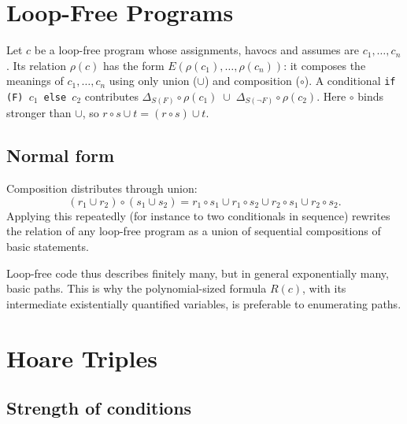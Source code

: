  
\section{Loop-Free Programs}
 
Let $c$ be a loop-free program whose assignments, havocs and assumes are $c_1, \ldots, c_n$. Its relation $\rho(c)$ has the form $E(\rho(c_1), \ldots, \rho(c_n))$: it composes the meanings of $c_1, \ldots, c_n$ using only union ($\cup$) and composition ($\circ$). A conditional \texttt{if (F) $c_1$ else $c_2$} contributes $\Delta_{S(F)} \circ \rho(c_1) \;\cup\; \Delta_{S(\neg F)} \circ \rho(c_2)$. Here $\circ$ binds stronger than $\cup$, so $r \circ s \cup t = (r \circ s) \cup t$.
 
\subsection*{Normal form}
 
Composition distributes through union:
\[
(r_1 \cup r_2) \circ (s_1 \cup s_2) = r_1 \circ s_1 \cup r_1 \circ s_2 \cup r_2 \circ s_1 \cup r_2 \circ s_2.
\]
Applying this repeatedly (for instance to two conditionals in sequence) rewrites the relation of any loop-free program as a union of sequential compositions of basic statements.
 
 
Loop-free code thus describes finitely many, but in general exponentially many, basic paths. This is why the polynomial-sized formula $R(c)$, with its intermediate existentially quantified variables, is preferable to enumerating paths.
 
\section{Hoare Triples}
 
\subsection*{Strength of conditions}
 
